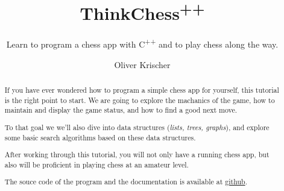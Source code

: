 \documentclass{scrreprt}
\numberwithin{equation}{chapter}
\begin{document}
\title{ThinkChess\textsuperscript{++}}
\author{Oliver Krischer}
\subtitle{Learn to program a chess app with C\textsuperscript{++} and to play chess along the way.}
\maketitle
\begin{abstract}
  If you have ever wondered how to program a simple chess app for yourself,
  this tutorial is the right point to start.
  We are going to explore the machanics of the game, how to maintain and display the game status,
  and how to find a good next move.

  To that goal we we'll also dive into data structures (\emph{lists, trees, graphs}),
  and explore some basic search algorithms based on these data structures.

  After working through this tutorial, you will not only have a running chess app,
  but also will be proficient in playing chess at an amateur level. 

  The souce code of the program and the documentation is available at
  \href{https://github.com/okrischer/ThinkChess}{github}.
\end{abstract}
\tableofcontents


\end{document}
